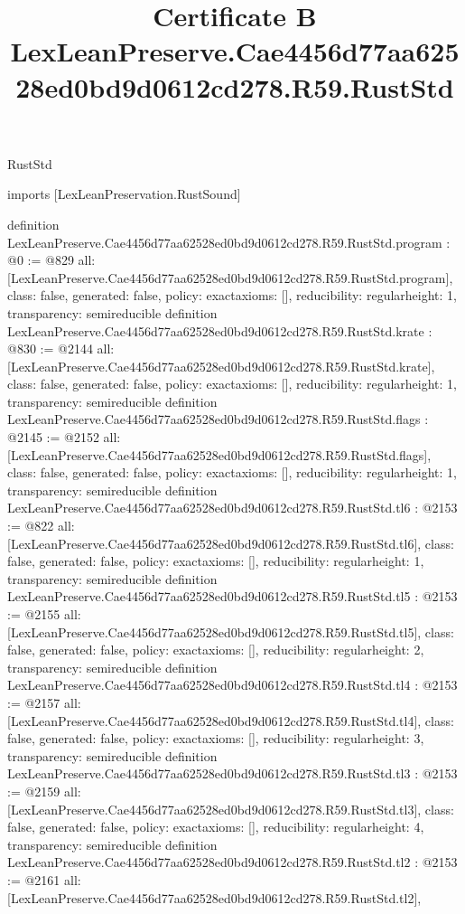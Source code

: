 \begin{lexlean}{RustStd}
\title{Certificate B LexLeanPreserve.Cae4456d77aa62528ed0bd9d0612cd278.R59.RustStd}
\begin{coremodule}
imports [LexLeanPreservation.RustSound]

definition LexLeanPreserve.Cae4456d77aa62528ed0bd9d0612cd278.R59.RustStd.program : @0 := @829 {
  all: [LexLeanPreserve.Cae4456d77aa62528ed0bd9d0612cd278.R59.RustStd.program],
  class: false,
  generated: false,
  policy: exact{axioms: []},
  reducibility: regular{height: 1},
  transparency: semireducible
}
definition LexLeanPreserve.Cae4456d77aa62528ed0bd9d0612cd278.R59.RustStd.krate : @830 := @2144 {
  all: [LexLeanPreserve.Cae4456d77aa62528ed0bd9d0612cd278.R59.RustStd.krate],
  class: false,
  generated: false,
  policy: exact{axioms: []},
  reducibility: regular{height: 1},
  transparency: semireducible
}
definition LexLeanPreserve.Cae4456d77aa62528ed0bd9d0612cd278.R59.RustStd.flags : @2145 := @2152 {
  all: [LexLeanPreserve.Cae4456d77aa62528ed0bd9d0612cd278.R59.RustStd.flags],
  class: false,
  generated: false,
  policy: exact{axioms: []},
  reducibility: regular{height: 1},
  transparency: semireducible
}
definition LexLeanPreserve.Cae4456d77aa62528ed0bd9d0612cd278.R59.RustStd.tl6 : @2153 := @822 {
  all: [LexLeanPreserve.Cae4456d77aa62528ed0bd9d0612cd278.R59.RustStd.tl6],
  class: false,
  generated: false,
  policy: exact{axioms: []},
  reducibility: regular{height: 1},
  transparency: semireducible
}
definition LexLeanPreserve.Cae4456d77aa62528ed0bd9d0612cd278.R59.RustStd.tl5 : @2153 := @2155 {
  all: [LexLeanPreserve.Cae4456d77aa62528ed0bd9d0612cd278.R59.RustStd.tl5],
  class: false,
  generated: false,
  policy: exact{axioms: []},
  reducibility: regular{height: 2},
  transparency: semireducible
}
definition LexLeanPreserve.Cae4456d77aa62528ed0bd9d0612cd278.R59.RustStd.tl4 : @2153 := @2157 {
  all: [LexLeanPreserve.Cae4456d77aa62528ed0bd9d0612cd278.R59.RustStd.tl4],
  class: false,
  generated: false,
  policy: exact{axioms: []},
  reducibility: regular{height: 3},
  transparency: semireducible
}
definition LexLeanPreserve.Cae4456d77aa62528ed0bd9d0612cd278.R59.RustStd.tl3 : @2153 := @2159 {
  all: [LexLeanPreserve.Cae4456d77aa62528ed0bd9d0612cd278.R59.RustStd.tl3],
  class: false,
  generated: false,
  policy: exact{axioms: []},
  reducibility: regular{height: 4},
  transparency: semireducible
}
definition LexLeanPreserve.Cae4456d77aa62528ed0bd9d0612cd278.R59.RustStd.tl2 : @2153 := @2161 {
  all: [LexLeanPreserve.Cae4456d77aa62528ed0bd9d0612cd278.R59.RustStd.tl2],
}
\end{coremodule}
\end{lexlean}
